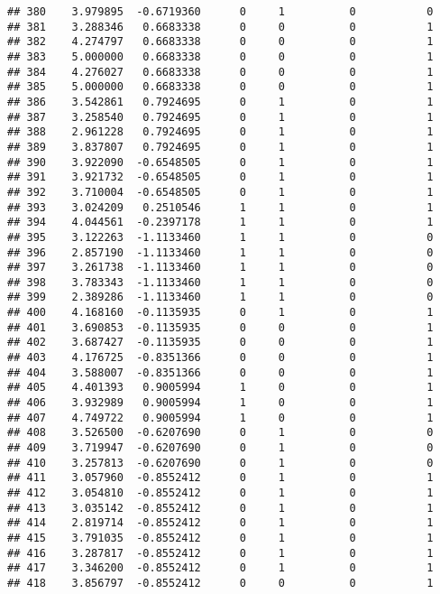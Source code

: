 \documentclass[
]{article}
\begin{document}
\begin{verbatim}
## 380    3.979895  -0.6719360      0     1          0           0
## 381    3.288346   0.6683338      0     0          0           1
## 382    4.274797   0.6683338      0     0          0           1
## 383    5.000000   0.6683338      0     0          0           1
## 384    4.276027   0.6683338      0     0          0           1
## 385    5.000000   0.6683338      0     0          0           1
## 386    3.542861   0.7924695      0     1          0           1
## 387    3.258540   0.7924695      0     1          0           1
## 388    2.961228   0.7924695      0     1          0           1
## 389    3.837807   0.7924695      0     1          0           1
## 390    3.922090  -0.6548505      0     1          0           1
## 391    3.921732  -0.6548505      0     1          0           1
## 392    3.710004  -0.6548505      0     1          0           1
## 393    3.024209   0.2510546      1     1          0           1
## 394    4.044561  -0.2397178      1     1          0           1
## 395    3.122263  -1.1133460      1     1          0           0
## 396    2.857190  -1.1133460      1     1          0           0
## 397    3.261738  -1.1133460      1     1          0           0
## 398    3.783343  -1.1133460      1     1          0           0
## 399    2.389286  -1.1133460      1     1          0           0
## 400    4.168160  -0.1135935      0     1          0           1
## 401    3.690853  -0.1135935      0     0          0           1
## 402    3.687427  -0.1135935      0     0          0           1
## 403    4.176725  -0.8351366      0     0          0           1
## 404    3.588007  -0.8351366      0     0          0           1
## 405    4.401393   0.9005994      1     0          0           1
## 406    3.932989   0.9005994      1     0          0           1
## 407    4.749722   0.9005994      1     0          0           1
## 408    3.526500  -0.6207690      0     1          0           0
## 409    3.719947  -0.6207690      0     1          0           0
## 410    3.257813  -0.6207690      0     1          0           0
## 411    3.057960  -0.8552412      0     1          0           1
## 412    3.054810  -0.8552412      0     1          0           1
## 413    3.035142  -0.8552412      0     1          0           1
## 414    2.819714  -0.8552412      0     1          0           1
## 415    3.791035  -0.8552412      0     1          0           1
## 416    3.287817  -0.8552412      0     1          0           1
## 417    3.346200  -0.8552412      0     1          0           1
## 418    3.856797  -0.8552412      0     0          0           1

\end{verbatim}
\end{document}
